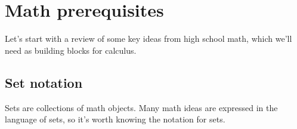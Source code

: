 
\section{Math prerequisites}

	Let's start with a review of some key ideas from high school math,
	which we'll need as building blocks for calculus.

	\subsection{Set notation}

		Sets are collections of math objects.
		Many math ideas are expressed in the language of sets,
		so it's worth knowing the notation for sets.	
